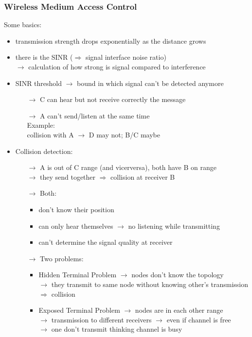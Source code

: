\subsubsection{Wireless Medium Access Control}
Some basics:
\begin{itemize}
    \item transmission strength drops exponentially as the distance grows
    \item there is the SINR ($\Rightarrow$ signal interface noise ratio)\\
    $\rightarrow$ calculation of how strong is signal compared to interference
    \item SINR threshold $\rightarrow$ bound in which signal can't be detected anymore
    \begin{itemize}
        \item[$\rightarrow$] C can hear but not receive correctly the message
        \item[$\rightarrow$] A can't send/listen at the same time\\
        Example:\\
        collision with A $\rightarrow$ D may not; B/C maybe
    \end{itemize}
    \item Collision detection:
    \begin{itemize}
        \item[$\rightarrow$] A is out of C range (and vicerversa), both have B on range\\
        $\rightarrow$ they send together $\Rightarrow$ collision at receiver B
        \item[$\rightarrow$] Both:
        \begin{itemize}
            \item don't know their position
            \item can only hear themselves $\rightarrow$ no listening while transmitting
            \item can't determine the signal quality at receiver
        \end{itemize}
        \item[$\rightarrow$] Two problems:
        \begin{itemize}
            \item Hidden Terminal Problem $\rightarrow$ nodes don't know the topology\\
            $\rightarrow$ they transmit to same node without knowing other's transmission\\
            $\Rightarrow$ collision
            \item Exposed Terminal Problem $\rightarrow$ nodes are in each other range\\
            $\rightarrow$ transmission to different receivers $\rightarrow$ even if channel is free\\
            $\rightarrow$ one don't transmit thinking channel is busy
        \end{itemize}
    \end{itemize}
    
\end{itemize}













